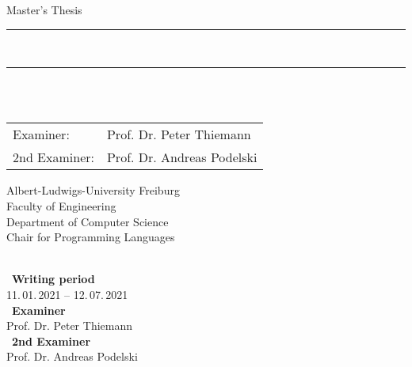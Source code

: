 
\begin{titlepage}
\begin{center}

\newcommand{\HorizontalLine}{\rule{\linewidth}{0.3mm}}

{\Large Master's Thesis}\\[1.3cm]


\HorizontalLine \\[0.4cm]
{ \huge \bfseries \thetitle }
\HorizontalLine \\[1.5cm]


{\Huge \theauthor} \\[2cm]


\begin{tabular}[hc]{>{\huge}l >{\huge}l}
  Examiner: & Prof. Dr. Peter Thiemann \\[0.3cm]
  2nd Examiner: & Prof. Dr. Andreas Podelski \\[0.3cm]
\end{tabular}
\vfill  %

\Large {
    Albert-Ludwigs-University Freiburg\\
    Faculty of Engineering\\
    Department of Computer Science\\
    Chair for Programming Languages\\[1cm]
}
\end{center}
\end{titlepage}

\thispagestyle{empty}
\ \vfill \ \\  %
\
\textbf{Writing period}            \smallskip{} \\
11.\,01.\,2021 -- 12.\,07.\,2021   \bigskip{} \\
\
\textbf{Examiner}                  \smallskip{} \\
Prof. Dr. Peter Thiemann               \bigskip{} \\
\
\textbf{2nd Examiner}                  \smallskip{} \\
Prof. Dr. Andreas Podelski
